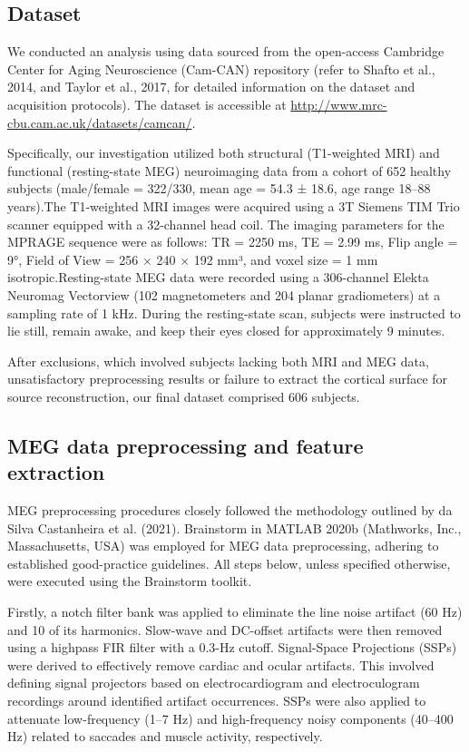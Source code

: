 \documentclass{cys}
\begin{document}
\subsection{Dataset}
We conducted an analysis using data sourced from the open-access Cambridge Center for Aging Neuroscience (Cam-CAN) repository (refer to Shafto et al., 2014, and Taylor et al., 2017, for detailed information on the dataset and acquisition protocols). The dataset is accessible at \url{http://www.mrc-cbu.cam.ac.uk/datasets/camcan/}.

\bigskip 
Specifically, our investigation utilized both structural (T1-weighted MRI) and functional (resting-state MEG) neuroimaging data from a cohort of 652 healthy subjects (male/female = 322/330, mean age = 54.3 ± 18.6, age range 18–88 years).The T1-weighted MRI images were acquired using a 3T Siemens TIM Trio scanner equipped with a 32-channel head coil. The imaging parameters for the MPRAGE sequence were as follows: TR = 2250 ms, TE = 2.99 ms, Flip angle = 9°, Field of View = 256 × 240 × 192 mm³, and voxel size = 1 mm isotropic.Resting-state MEG data were recorded using a 306-channel Elekta Neuromag Vectorview (102 magnetometers and 204 planar gradiometers) at a sampling rate of 1 kHz. During the resting-state scan, subjects were instructed to lie still, remain awake, and keep their eyes closed for approximately 9 minutes. 

\bigskip 
After exclusions, which involved subjects lacking both MRI and MEG data, unsatisfactory preprocessing results or failure to extract the cortical surface for source reconstruction, our final dataset comprised 606 subjects.

\bigskip
\subsection{MEG data preprocessing and feature extraction}

MEG preprocessing procedures closely followed the methodology outlined by da Silva Castanheira et al. (2021). Brainstorm in MATLAB 2020b (Mathworks, Inc., Massachusetts, USA) was employed for MEG data preprocessing, adhering to established good-practice guidelines. All steps below, unless specified otherwise, were executed using the Brainstorm toolkit.

\bigskip
Firstly, a notch filter bank was applied to eliminate the line noise artifact (60 Hz) and 10 of its harmonics. Slow-wave and DC-offset artifacts were then removed using a highpass FIR filter with a 0.3-Hz cutoff. Signal-Space Projections (SSPs) were derived to effectively remove cardiac and ocular artifacts. This involved defining signal projectors based on electrocardiogram and electroculogram recordings around identified artifact occurrences. SSPs were also applied to attenuate low-frequency (1–7 Hz) and high-frequency noisy components (40–400 Hz) related to saccades and muscle activity, respectively.
\end{document}
